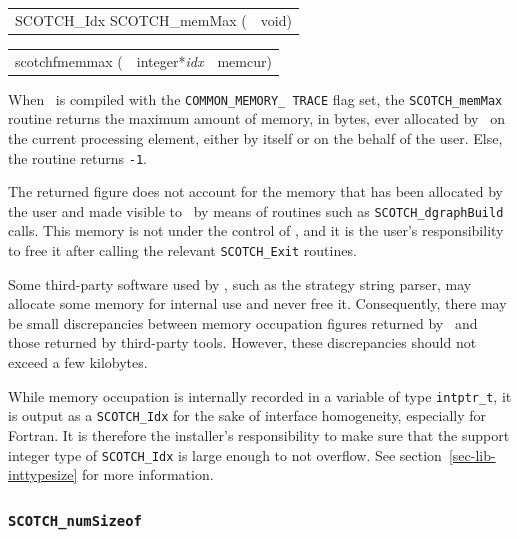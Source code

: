 \begin{itemize}
\progsyn

{\tt\begin{tabular}{l@{}l}
SCOTCH\_Idx SCOTCH\_memMax ( & void)
\end{tabular}}

{\tt\begin{tabular}{l@{}ll}
scotchfmemmax ( & integer*{\it idx} & memcur) \\

\end{tabular}}

\progdes

When \scotch\ is compiled with the {\tt COMMON\_\lbt MEMORY\_\lbt
TRACE} flag set, the {\tt SCOTCH\_memMax} routine returns the maximum
amount of memory, in bytes, ever allocated by \scotch\ on the current
processing element, either by itself or on the behalf of the
user. Else, the routine returns {\tt -1}.

The returned figure does not account for the memory that has been
allocated by the user and made visible to \scotch\ by means of
routines such as {\tt SCOTCH\_\lbt dgraph\lbt Build} calls. This
memory is not under the control of \scotch, and it is the user's
responsibility to free it after calling the relevant
{\tt SCOTCH\_\lbt *\lbt Exit} routines.

Some third-party software used by \scotch, such as the strategy string
parser, may allocate some memory for internal use and never free it.
Consequently, there may be small discrepancies between memory
occupation figures returned by \scotch\ and those returned by
third-party tools. However, these discrepancies should not exceed a
few kilobytes.

While memory occupation is internally recorded in a variable of type
{\tt intptr\_\lbt t}, it is output as a {\tt SCOTCH\_\lbt Idx} for the
sake of interface homogeneity, especially for Fortran. It is therefore
the installer's responsibility to make sure that the support integer
type of {\tt SCOTCH\_\lbt Idx} is large enough to not overflow. See
section~\ref{sec-lib-inttypesize} for more information.
\end{itemize}

\subsubsection{{\tt SCOTCH\_numSizeof}}

